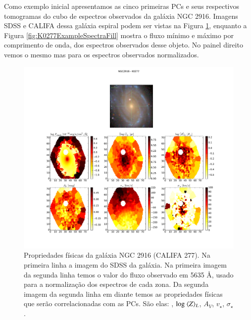 Como exemplo inicial apresentamos as cinco primeiras PCs e seus respectivos tomogramas do cubo de espectros observados
da galáxia NGC 2916. Imagens SDSS e CALIFA dessa galáxia espiral podem ser vistas na Figura \ref{fig:K0277apresent},
enquanto a Figura \ref{fig:K0277ExampleSpectraFill} mostra o fluxo mínimo e máximo por comprimento de onda, dos
espectros observados desse objeto. No painel direito vemos o mesmo mas para os espectros observados normalizados.

\begin{figure}
    \includegraphics[width=1.\textwidth]{figuras/K0277-apresent.pdf}
    \caption[Propriedades f\'isicas da gal\'axia NGC 2916 (CALIFA 277).]
    {Propriedades físicas da galáxia NGC 2916 (CALIFA 277). Na primeira linha a imagem do SDSS da galáxia. Na primeira
    imagem da segunda linha temos o valor do fluxo observado em 5635 \AA, usado para a normalização dos espectros de
    cada zona. Da segunda imagem da segunda linha em diante temos as propriedades físicas que serão correlacionadas com
    as PCs. São elas: , $\log\ \meanL{Z}$, $A_V$, $v_{\star}$, $\sigma_{\star}$.}
    \label{fig:K0277apresent}
\end{figure}


